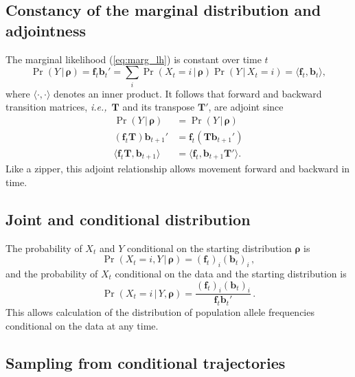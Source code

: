 \documentclass[preprint]{elsarticle}
\newcommand{\bs}[1]{\ensuremath{\boldsymbol{#1}}}
\newcommand\given{{\,|\,}}
\newcommand\ie{{\it i.e.,}}
\newcommand\x[1]{\ensuremath{X_{#1}}}
\newcommand\y{\ensuremath{Y}}
\newcommand\fv[1]{\ensuremath{\mathbf{f}_{#1}}}
\newcommand\bv[1]{\ensuremath{\mathbf{b}_{#1}}}
\begin{document}
\subsection{Constancy of the marginal distribution and adjointness}

The marginal likelihood (\ref{eq:marg_lh}) is constant over time $t$ 
\begin{equation}
\Pr(\y \given \bs{\rho}) = \fv{t}\bv{t}' =\sum_i \Pr(\x{t}=i \given \bs{\rho}) \Pr(\y \given \x{t}=i) = \langle \fv{t}, \bv{t} \rangle,
\end{equation}
where $\langle \cdot , \cdot \rangle$ denotes an inner product.  It follows that forward and backward transition matrices, \ie\ $\mathbf{T}$ and its transpose $\mathbf{T}'$, are adjoint since
\begin{equation}\label{eq:adjoint_discrete}
\begin{split}
\Pr(\y \given \bs{\rho})              &= \Pr(\y \given \bs{\rho}) \\
(\fv{t}\mathbf{T})\bv{t+1}' &= \fv{t} (\mathbf{T}\bv{t+1}') \\
\langle \fv{t}\mathbf{T},\bv{t+1} \rangle   &= \langle  \fv{t},\bv{t+1}\mathbf{T}' \rangle.
\end{split}
\end{equation}
Like a zipper, this adjoint relationship allows movement forward and backward in time.

\subsection{Joint and conditional distribution}

The probability of $\x{t}$ and $\y$ conditional on the starting distribution $\bs{\rho}$ is
\begin{equation}\label{eq:joint_xy_discr}
\Pr(\x{t}=i,\y \given \bs{\rho}) = (\fv{t})_i (\bv{t})_i\,,
\end{equation}
and the probability of $\x{t}$ conditional on the data and the starting distribution is
\begin{equation}\label{eq:cond_x|y_discr}
\Pr(\x{t}=i \given \y,\bs{\rho}) = \frac{(\fv{t})_i (\bv{t})_i}{\fv{t}\bv{t}'}\,.
\end{equation}
This allows calculation of the distribution of population allele frequencies conditional on the data at any time. 

\subsection{Sampling from conditional trajectories}
\end{document}
